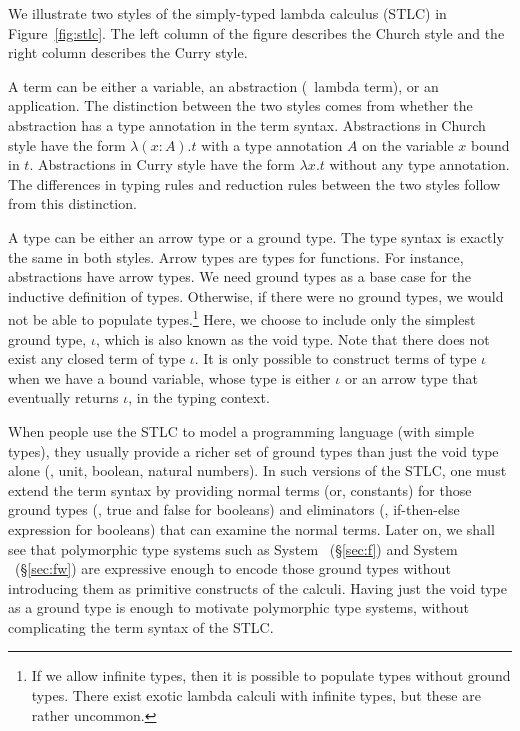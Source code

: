 We illustrate two styles of the simply-typed lambda calculus (STLC)
in Figure~\ref{fig:stlc}. The left column of the figure describes
the Church style and the right column describes the Curry style.

A term can be either a variable, an abstraction (\aka\ lambda term), or
an application. The distinction between the two styles comes from whether
the abstraction has a type annotation in the term syntax. Abstractions in
Church style have the form $\lambda(x:A).t$ with a type annotation $A$ on
the variable $x$ bound in $t$. Abstractions in Curry style have the form
$\lambda x.t$ without any type annotation. The differences in typing rules
and reduction rules between the two styles follow from this distinction.

A type can be either an arrow type or a ground type.
The type syntax is exactly the same in both styles.
Arrow types are types for functions. For instance,
abstractions have arrow types. We need ground types as a base case for
the inductive definition of types. Otherwise, if there were no ground types,
we would not be able to populate types.\footnote{
	If we allow infinite types,
	then it is possible to populate types without ground types.
	There exist exotic lambda calculi with infinite types, but
	these are rather uncommon.}
Here, we choose to include only the simplest ground type, $\iota$, which is
also known as the void type. Note that there does not exist any closed term
of type $\iota$. It is only possible to construct terms of type $\iota$ when
we have a bound variable, whose type is either $\iota$ or an arrow type that
eventually returns $\iota$, in the typing context.

When people use the STLC to model a programming language (with simple types),
they usually provide a richer set of ground types than just the void type alone
(\eg, unit, boolean, natural numbers). In such versions of the STLC, 
one must extend the term syntax by providing normal terms (or, constants) for
those ground types (\eg, \textsf{true} and \textsf{false} for booleans) and
eliminators (\eg, if-then-else expression for booleans) that can examine
the normal terms. Later on, we shall see that polymorphic type systems
such as System \F\ (\S\ref{sec:f}) and System \Fw\ (\S\ref{sec:fw}) are
expressive enough to encode those ground types without introducing them
as primitive constructs of the calculi. Having just the void type as
a ground type is enough to motivate polymorphic type systems, without
complicating the term syntax of the STLC.

